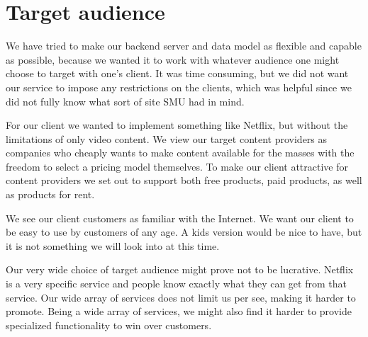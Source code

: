 \section{Target audience}
We have tried to make our backend server and data model as flexible and capable as possible, because we wanted it to work with whatever audience one might choose to target with one's client. It was time consuming, but we did not want our service to impose any restrictions on the clients, which was helpful since we did not fully know what sort of site SMU had in mind.

For our client we wanted to implement something like Netflix, but without the limitations of only video content. 
We view our target content providers as companies who cheaply wants to make content available for the masses with the freedom to select a pricing model themselves.
To make our client attractive for content providers we set out to support both free products, paid products, as well as products for rent.

We see our client customers as familiar with the Internet. We want our client to be easy to use by customers of any age. A kids version would be nice to have, but it is not something we will look into at this time.

Our very wide choice of target audience might prove not to be lucrative. Netflix is a very specific service and people know exactly what they can get from that service. Our wide array of services does not limit us per see, making it harder to promote. Being a wide array of services, we might also find it harder to provide specialized functionality to win over customers.
\newpage